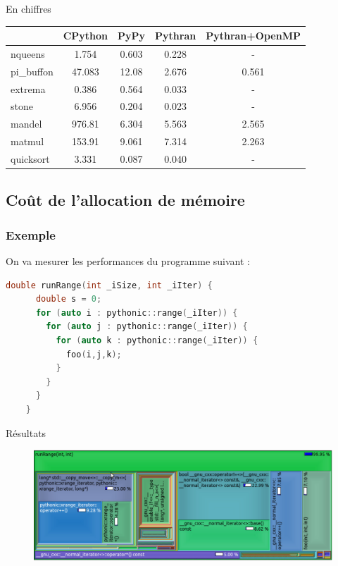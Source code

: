 \documentclass{beamer}
\begin{document}
\begin{frame}{En chiffres\cite{PythranRenpar}}

\begin{table}
  \centering
  \begin{tabular}{l|c|c|c|c}
    &CPython	&	PyPy	&	Pythran	&	Pythran+OpenMP\\
    \hline
    \hline
    nqueens		&1.754		&	0.603	&	0.228	&	-		  \\
    pi\_buffon	&47.083		&	12.08	&	2.676	&	0.561		\\
    extrema		&0.386		&	0.564	&	0.033	&	-\\
    stone		&6.956		&	0.204	&	0.023	&	-\\
    mandel		&976.81		&	6.304	&	5.563	&	2.565\\
    matmul		&153.91		&	9.061	&	7.314	&	2.263\\
    quicksort	&3.331		&	0.087	&	0.040	&	-\\
  \end{tabular}
\end{table}

\end{frame}

\subsection{Coût de l'allocation de mémoire}

\begin{frame}[fragile]
\frametitle{Exemple}

  On va mesurer les performances du programme suivant :

  \begin{lstlisting}[language=C++]
    double runRange(int _iSize, int _iIter) {
      double s = 0;
      for (auto i : pythonic::range(_iIter)) {
        for (auto j : pythonic::range(_iIter)) {
          for (auto k : pythonic::range(_iIter)) {
            foo(i,j,k);
          }
        }
      }
    }
  \end{lstlisting}

\end{frame}

\begin{frame}{Résultats}

  \begin{figure}[h]
    \includegraphics[width=\textwidth]{./Pictures/range}
    \label{pythonvscpp}
  \end{figure}

\end{frame}
\end{document}
